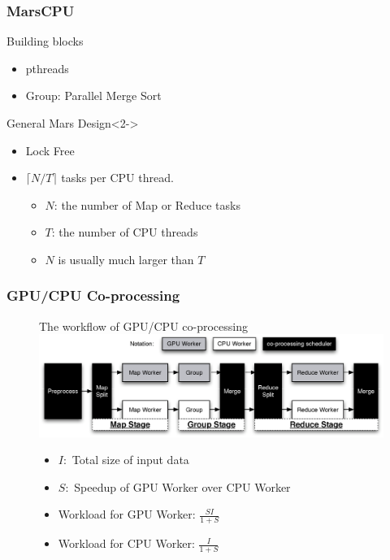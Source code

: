 \begin{frame}
\frametitle{MarsCPU}
\begin{block}{Building blocks}
\begin{itemize}
\item pthreads
\item Group: Parallel Merge Sort
\end{itemize}
\end{block}
\begin{block}{General Mars Design}<2->
\begin{itemize}
\item Lock Free
\item $\lceil N/T \rceil$ tasks per CPU thread.
\begin{itemize}
\item $N$: the number of Map or Reduce tasks
\item $T$: the number of CPU threads
\item $N$ is usually much larger than $T$
\end{itemize}
\end{itemize}
\end{block}
\end{frame}

\begin{frame}
\frametitle{GPU/CPU Co-processing}
\begin{figure}[h]
\begin{block}{The workflow of GPU/CPU co-processing}
  \includegraphics[width=1.00\textwidth]{figure/Mars+.eps} 
\end{block}
\begin{itemize}
\item $I:$ Total size of input data
\item $S:$ Speedup of GPU Worker over CPU Worker
\item Workload for GPU Worker: $\frac{SI}{1+S}$
\item Workload for CPU Worker: $\frac{I}{1+S}$
\end{itemize}
\end{figure}
\end{frame}

